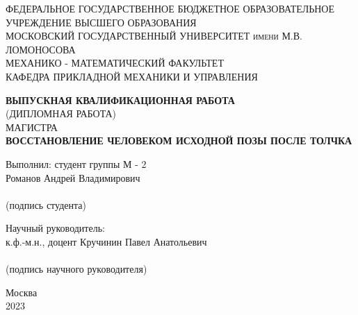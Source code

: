\documentclass[a4paper,12pt, openany]{book}
\theoremstyle{plain} %
\theoremstyle{definition} %
\theoremstyle{remark} %
\numberwithin{equation}{chapter}
\begin{document}
\listoftodos
\newpage
\thispagestyle{empty}


\begin{center}
\large{\textsc{ФЕДЕРАЛЬНОЕ ГОСУДАРСТВЕННОЕ БЮДЖЕТНОЕ ОБРАЗОВАТЕЛЬНОЕ
УЧРЕЖДЕНИЕ ВЫСШЕГО ОБРАЗОВАНИЯ}
}\\
\large{\textsc{МОСКОВСКИЙ ГОСУДАРСТВЕННЫЙ УНИВЕРСИТЕТ имени М.В. ЛОМОНОСОВА}
} \\
 \vspace{0.4cm}
\large{\textsc{МЕХАНИКО - МАТЕМАТИЧЕСКИЙ ФАКУЛЬТЕТ}}\\
\vspace{0.4cm}
\large{\textsc{КАФЕДРА ПРИКЛАДНОЙ МЕХАНИКИ И УПРАВЛЕНИЯ}}\\
\hfill \break

\hfill \break
\large{\textbf{ВЫПУСКНАЯ КВАЛИФИКАЦИОННАЯ РАБОТА}\\
(ДИПЛОМНАЯ РАБОТА) \\ МАГИСТРА \\
\hfill \break \textsc{\textbf{ВОССТАНОВЛЕНИЕ ЧЕЛОВЕКОМ ИСХОДНОЙ ПОЗЫ ПОСЛЕ ТОЛЧКА}
}}
\end{center}
 
\vspace{1.5cm}
\begin{flushright}
\large{
Выполнил: студент группы М - 2 \\ Романов Андрей Владимирович} \\ \vspace{0.68cm}  \underline{\hspace{6.5cm}} \\ 
 (подпись студента)

\end{flushright}
 
\begin{flushright}
\large{
Научный руководитель: \\ к.ф.-м.н., доцент Кручинин Павел Анатольевич} \\ \vspace{0.68cm}
 \underline{\hspace{6.5cm}} \\
 (подпись научного руководителя)
\end{flushright}
\vspace{0.7cm}
\begin{center} \large{Москва \\  2023} \end{center}
\end{document}
